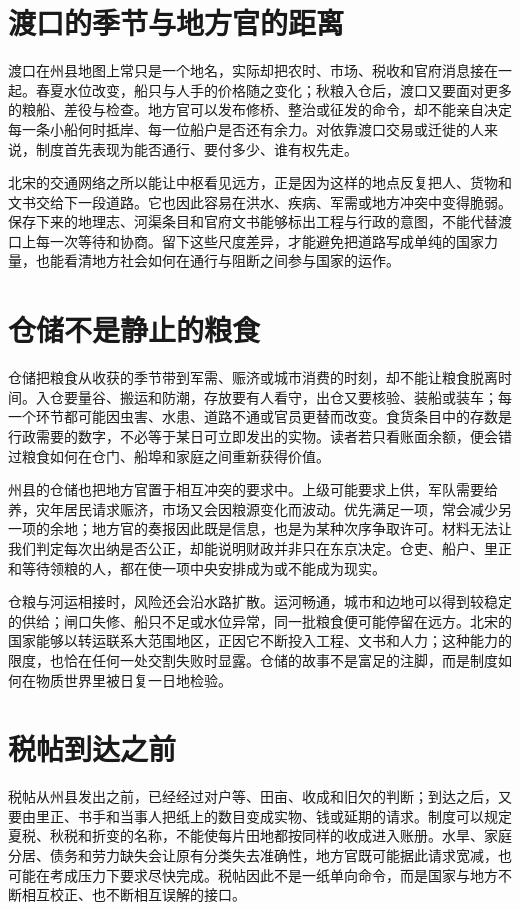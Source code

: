 \section{渡口的季节与地方官的距离}

渡口在州县地图上常只是一个地名，实际却把农时、市场、税收和官府消息接在一起。春夏水位改变，船只与人手的价格随之变化；秋粮入仓后，渡口又要面对更多的粮船、差役与检查。地方官可以发布修桥、整治或征发的命令，却不能亲自决定每一条小船何时抵岸、每一位船户是否还有余力。对依靠渡口交易或迁徙的人来说，制度首先表现为能否通行、要付多少、谁有权先走。

北宋的交通网络之所以能让中枢看见远方，正是因为这样的地点反复把人、货物和文书交给下一段道路。它也因此容易在洪水、疾病、军需或地方冲突中变得脆弱。保存下来的地理志、河渠条目和官府文书能够标出工程与行政的意图，不能代替渡口上每一次等待和协商。留下这些尺度差异，才能避免把道路写成单纯的国家力量，也能看清地方社会如何在通行与阻断之间参与国家的运作。

\section{仓储不是静止的粮食}

仓储把粮食从收获的季节带到军需、赈济或城市消费的时刻，却不能让粮食脱离时间。入仓要量谷、搬运和防潮，存放要有人看守，出仓又要核验、装船或装车；每一个环节都可能因虫害、水患、道路不通或官员更替而改变。食货条目中的存数是行政需要的数字，不必等于某日可立即发出的实物。读者若只看账面余额，便会错过粮食如何在仓门、船埠和家庭之间重新获得价值。

州县的仓储也把地方官置于相互冲突的要求中。上级可能要求上供，军队需要给养，灾年居民请求赈济，市场又会因粮源变化而波动。优先满足一项，常会减少另一项的余地；地方官的奏报因此既是信息，也是为某种次序争取许可。材料无法让我们判定每次出纳是否公正，却能说明财政并非只在东京决定。仓吏、船户、里正和等待领粮的人，都在使一项中央安排成为或不能成为现实。

仓粮与河运相接时，风险还会沿水路扩散。运河畅通，城市和边地可以得到较稳定的供给；闸口失修、船只不足或水位异常，同一批粮食便可能停留在远方。北宋的国家能够以转运联系大范围地区，正因它不断投入工程、文书和人力；这种能力的限度，也恰在任何一处交割失败时显露。仓储的故事不是富足的注脚，而是制度如何在物质世界里被日复一日地检验。

\section{税帖到达之前}

税帖从州县发出之前，已经经过对户等、田亩、收成和旧欠的判断；到达之后，又要由里正、书手和当事人把纸上的数目变成实物、钱或延期的请求。制度可以规定夏税、秋税和折变的名称，不能使每片田地都按同样的收成进入账册。水旱、家庭分居、债务和劳力缺失会让原有分类失去准确性，地方官既可能据此请求宽减，也可能在考成压力下要求尽快完成。税帖因此不是一纸单向命令，而是国家与地方不断相互校正、也不断相互误解的接口。

